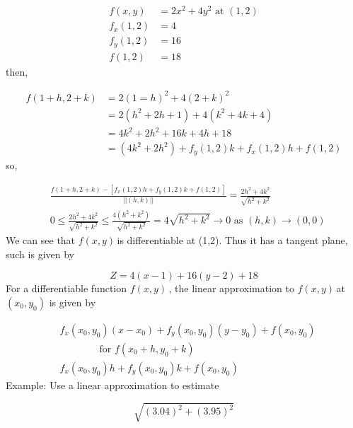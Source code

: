 \documentclass{article}
\newcommand{\n}{\leavevmode \newline} %
\newcommand{\fxy}{$f(x,y)\,$} %
\numberwithin{equation}{subsection} %
\begin{document}
\begin{equation}
    \begin{split}
        f(x,y)&=2x^2+4y^2 \text{ at } (1,2)\\
        f_x(1,2)&=4\\
        f_y(1,2)&=16\\
        f(1,2)&=18
    \end{split}
\end{equation}
\n
then,

\begin{equation}
    \begin{split}
        f(1+h,2+k)&=2(1=h)^2+4(2+k)^2\\
        &= 2(h^2+2h+1)+4(k^2+4k+4)\\
        &=4k^2+2h^2+16k+4h+18\\
        &=(4k^2+2h^2)+f_y(1,2)k+f_x(1,2)h+f(1,2)
    \end{split}
\end{equation}
\n
so,

\begin{equation}
    \begin{split}
        &\frac{f(1+h,2+k)-\left[f_x(1,2)h+f_y(1,2)k+f(1,2)\right]}{||(h,k)||}=\frac{2h^2+4k^2}{\sqrt{h^2+k^2}}\\
        &0\leq \frac{2h^2+4k^2}{\sqrt{h^2+k^2}} \leq \frac{4(h^2+k^2)}{\sqrt{h^2+k^2}} = 4\sqrt{h^2+k^2} \to 0 \text{ as } (h,k) \to (0,0)
    \end{split}
\end{equation}
\n
We can see that \fxy is differentiable at (1,2). Thus it has a tangent plane, such is given by

\begin{equation}
    Z=4(x-1)+16(y-2)+18
\end{equation}
\n
For a differentiable function \fxy, the linear approximation to \fxy at $(x_0,y_0)$ is given by

\begin{equation}
    \begin{split}
        &f_x(x_0,y_0)(x-x_0)+f_y(x_0,y_0)(y-y_0)+f(x_0,y_0)\\
        &\qquad\qquad\text{for }f(x_0+h,y_0+k)\\
        &f_x(x_0,y_0)h+f_y(x_0,y_0)k+f(x_0,y_0)
    \end{split}
\end{equation}
\n
Example: Use a linear approximation to estimate

\begin{equation}
    \sqrt{(3.04)^2+(3.95)^2}
\end{equation}
\end{document}
